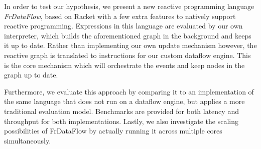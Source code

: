 In order to test our hypothesis, we present a new reactive programming language \textit{FrDataFlow}, based on Racket with a few extra features to natively support reactive programming. Expressions in this language are evaluated by our own interpreter, which builds the aforementioned graph in the background and keeps it up to date. Rather than implementing our own update mechanism however, the reactive graph is translated to instructions for our custom dataflow engine. This is the core mechanism which will orchestrate the events and keep nodes in the graph up to date.

Furthermore, we evaluate this approach by comparing it to an implementation of the same language that does not run on a dataflow engine, but applies a more traditional evaluation model. Benchmarks are provided for both latency and throughput for both implementations. Lastly, we also investigate the scaling possibilities of FrDataFlow by actually running it across multiple cores simultaneously. 
